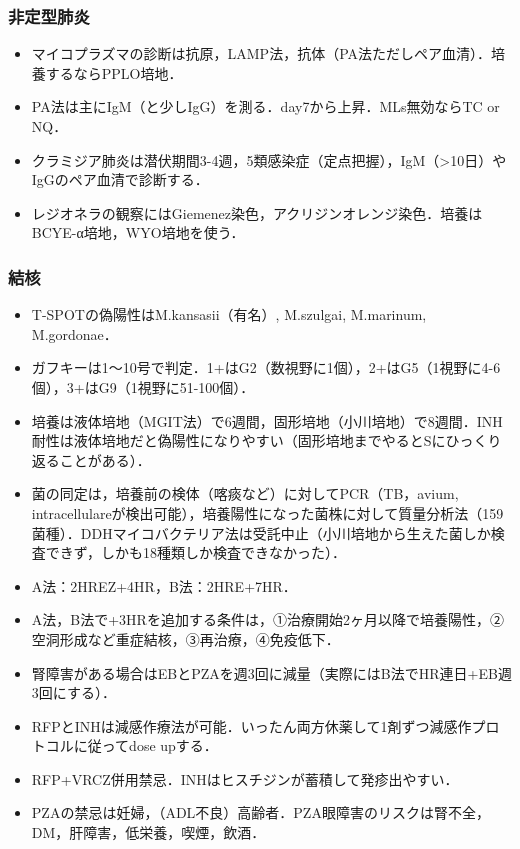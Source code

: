 \subsubsection{非定型肺炎}
\begin{itemize}
\item マイコプラズマの診断は抗原，LAMP法，抗体（PA法ただしペア血清）．培養するならPPLO培地．
\item PA法は主にIgM（と少しIgG）を測る．day7から上昇．MLs無効ならTC or NQ．
\item クラミジア肺炎は潜伏期間3-4週，5類感染症（定点把握），IgM（>10日）やIgGのペア血清で診断する．
\item レジオネラの観察にはGiemenez染色，アクリジンオレンジ染色．培養はBCYE-α培地，WYO培地を使う．
\end{itemize}

\subsubsection{結核}

\begin{itemize}
\item T-SPOTの偽陽性はM.kansasii（有名）, M.szulgai, M.marinum, M.gordonae．
\item ガフキーは1〜10号で判定．1+はG2（数視野に1個），2+はG5（1視野に4-6個），3+はG9（1視野に51-100個）．
\item 培養は液体培地（MGIT法）で6週間，固形培地（小川培地）で8週間．INH耐性は液体培地だと偽陽性になりやすい（固形培地までやるとSにひっくり返ることがある）．
\item 菌の同定は，培養前の検体（喀痰など）に対してPCR（TB，avium, intracellulareが検出可能），培養陽性になった菌株に対して質量分析法（159菌種）．DDHマイコバクテリア法は受託中止（小川培地から生えた菌しか検査できず，しかも18種類しか検査できなかった）．

\item A法：2HREZ+4HR，B法：2HRE+7HR．
\item A法，B法で+3HRを追加する条件は，①治療開始2ヶ月以降で培養陽性，②空洞形成など重症結核，③再治療，④免疫低下．
\item 腎障害がある場合はEBとPZAを週3回に減量（実際にはB法でHR連日+EB週3回にする）．
\item RFPとINHは減感作療法が可能．いったん両方休薬して1剤ずつ減感作プロトコルに従ってdose upする．
\item RFP+VRCZ併用禁忌．INHはヒスチジンが蓄積して発疹出やすい．
\item PZAの禁忌は妊婦，（ADL不良）高齢者．PZA眼障害のリスクは腎不全，DM，肝障害，低栄養，喫煙，飲酒．

\end{itemize}
